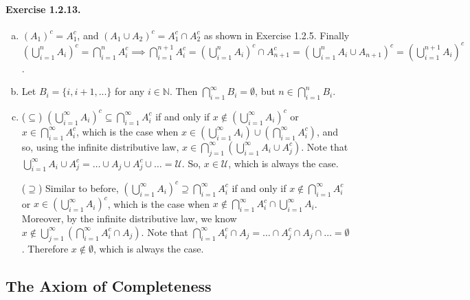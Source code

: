 \documentclass{article}
\newcommand{\N}{\mathbb{N}}
\begin{document}
\newcommand{\infcupset}{\bigcup_{i=1}^\infty A_i}
\newcommand{\infcapset}{\bigcap_{i=1}^\infty A_i}

\paragraph{Exercise 1.2.13.}
\begin{enumerate}[(a)]
    \item $(A_1)^c=A_1^c$, and $(A_1\cup A_2)^c=A_1^c \cap A_2^c$ as shown in Exercise 1.2.5. Finally $(\bigcup_{i=1}^nA_i)^c = \bigcap_{i=1}^n A_i^c \implies \bigcap_{i=1}^{n+1} A_i^c = (\bigcup_{i=1}^nA_i)^c \cap A_{n+1}^c = (\bigcup_{i=1}^nA_i \cup A_{n+1})^c = (\bigcup_{i=1}^{n+1}A_i)^c$.
    \item Let $B_i=\{i, i+1,...\}$ for any $i \in \N$. Then $\bigcap_{i=1}^\infty B_i = \emptyset$, but $n \in \bigcap_{i=1}^{n}B_i$.
    
    \item ($\subseteq$) $(\infcupset)^c \subseteq \infcapset^c$ if and only if $ x\notin (\infcupset)^c$ or $x\in \infcapset^c$, which is the case when $x\in(\infcupset) \cup (\infcapset^c) $, and so, using the infinite distributive law, $ x\in \bigcap_{j=1}^\infty(\infcupset \cup A_j^c) $. Note that $\infcupset \cup A_j^c = \ldots \cup A_j \cup A_j^c \cup \ldots = \mathcal{U}$. So, $ x \in \mathcal{U}$, which is always the case.

    ($\supseteq$) Similar to before, $(\infcupset)^c \supseteq \infcapset^c$ if and only if $x\notin \infcapset^c$ or $x\in (\infcupset)^c$, which is the case when $x \notin \infcapset^c \cap \infcupset$. Moreover, by the infinite distributive law, we know $x\notin \bigcup_{j=1}^\infty(\infcapset^c \cap A_j)$. Note that $\infcapset^c \cap A_j = \ldots \cap A_j^c \cap A_j \cap \ldots = \emptyset$. Therefore $x\notin \emptyset$, which is always the case.
\end{enumerate}


\subsection{The Axiom of Completeness}
\end{document}
